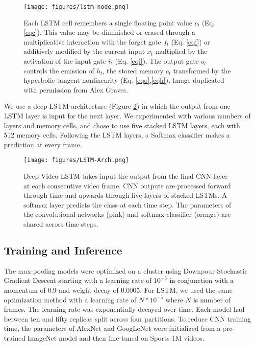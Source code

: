 \documentclass[10pt,twocolumn,letterpaper]{article}
\begin{document}
\begin{figure}[t]
\begin{center}
\texttt{[image: figures/lstm-node.png]}
\end{center}
\caption{Each LSTM cell remembers a single floating point value $c_t$ (Eq. \ref{eqc}). This value may be diminished or erased through a multiplicative interaction with the forget gate $f_t$ (Eq. \ref{eqf}) or additively modified by the current input $x_t$ multiplied by the activation of the input gate $i_t$ (Eq. \ref{eqi}). The output gate $o_t$ controls the emission of $h_t$, the stored memory $c_t$ transformed by the hyperbolic tangent nonlinearity (Eq. \ref{eqo},\ref{eqh}). Image duplicated with permission from Alex Graves.}
\label{fig:lstm_cell}
\end{figure}%
We use a deep LSTM architecture \cite{graves13speech} (Figure
\ref{fig:lstm-arch}) in which the output from one LSTM layer is input
for the next layer. We experimented with various numbers of layers
and memory cells, and chose to use five stacked LSTM layers, each
with 512 memory cells. Following the LSTM layers, a Softmax classifier
makes a prediction at every frame.

\begin{figure}[ht]
\begin{center}
\texttt{[image: figures/LSTM-Arch.png]}
\end{center}
\caption{Deep Video LSTM takes input the output from the final CNN
  layer at each consecutive video frame. CNN outputs are processed
  forward through time and upwards through five layers of stacked
  LSTMs. A softmax layer predicts the class at each time step.
  The parameters of the convolutional networks (pink) and softmax
  classifier (orange) are shared across time steps.}
\label{fig:lstm-arch}
\end{figure}\vspace{-.6em}\subsection{Training and Inference}\vspace{-.6em}\label{subsec:training}
The max-pooling models were optimized on a cluster using Downpour Stochastic Gradient Descent
starting with a learning rate of $10^{-5}$ in conjunction with a momentum of 0.9 and weight decay of 0.0005.
For LSTM, we used the same optimization method with a learning rate of $N *
10^{-5}$ where $N$ is number of frames.  The learning rate was exponentially
decayed over time. Each model had between ten and fifty replicas split across
four partitions. To reduce CNN training time, the parameters of AlexNet and
GoogLeNet were initialized from a pre-trained ImageNet model and then
fine-tuned on Sports-1M videos.
\end{document}
